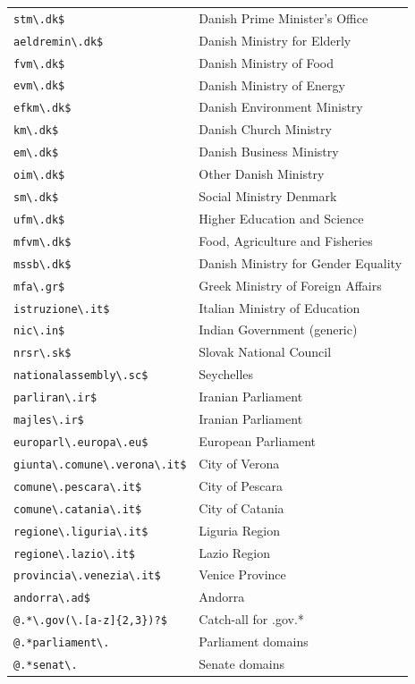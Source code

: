 \documentclass[12pt, letterpaper]{article}
\begin{document}
\begin{table}[ht]
\begin{tabular}{@{\hspace{0\tabcolsep}}ll@{\hspace{0\tabcolsep}}}
\verb|stm\.dk$| & Danish Prime Minister's Office \\
\verb|aeldremin\.dk$| & Danish Ministry for Elderly \\
\verb|fvm\.dk$| & Danish Ministry of Food \\
\verb|evm\.dk$| & Danish Ministry of Energy \\
\verb|efkm\.dk$| & Danish Environment Ministry \\
\verb|km\.dk$| & Danish Church Ministry \\
\verb|em\.dk$| & Danish Business Ministry \\
\verb|oim\.dk$| & Other Danish Ministry \\
\verb|sm\.dk$| & Social Ministry Denmark \\
\verb|ufm\.dk$| & Higher Education and Science \\
\verb|mfvm\.dk$| & Food, Agriculture and Fisheries \\
\verb|mssb\.dk$| & Danish Ministry for Gender Equality \\
\verb|mfa\.gr$| & Greek Ministry of Foreign Affairs \\
\verb|istruzione\.it$| & Italian Ministry of Education \\
\verb|nic\.in$| & Indian Government (generic) \\
\verb|nrsr\.sk$| & Slovak National Council \\
\verb|nationalassembly\.sc$| & Seychelles \\
\verb|parliran\.ir$| & Iranian Parliament \\
\verb|majles\.ir$| & Iranian Parliament \\
\verb|europarl\.europa\.eu$| & European Parliament \\
\verb|giunta\.comune\.verona\.it$| & City of Verona \\
\verb|comune\.pescara\.it$| & City of Pescara \\
\verb|comune\.catania\.it$| & City of Catania \\
\verb|regione\.liguria\.it$| & Liguria Region \\
\verb|regione\.lazio\.it$| & Lazio Region \\
\verb|provincia\.venezia\.it$| & Venice Province \\
\verb|andorra\.ad$| & Andorra \\
\verb|@.*\.gov(\.[a-z]{2,3})?$| & Catch-all for .gov.* \\
\verb|@.*parliament\.| & Parliament domains \\
\verb|@.*senat\.| & Senate domains \\

\end{tabular}
\end{table}
\end{document}
